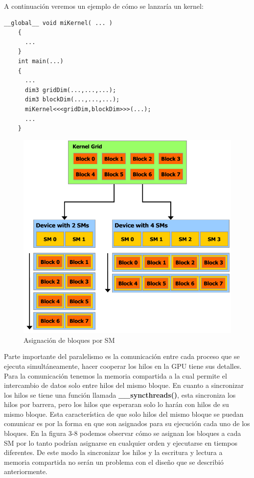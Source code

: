 A continuación veremos un ejemplo de cómo se lanzaría un kernel:

\begin{lstlisting}[caption=Lanzamiento de un Kernel en CUDA C.]
	__global__ void miKernel( ... )
    {
   	  ...
    }
	int main(...)
	{
	  ...	
	  dim3 gridDim(...,...,...);
	  dim3 blockDim(...,...,...);
	  miKernel<<<gridDim,blockDim>>>(...);	
	  ...
	}
\end{lstlisting}

\begin{figure}[h]
			\centering
				\includegraphics[scale=0.4]{img/block_sm.png}
			\caption{Asignación de bloques por SM \cite{Flops}}
\end{figure}

\pagebreak
Parte importante del paralelismo es la comunicación entre cada proceso que se ejecuta simultáneamente, hacer cooperar los hilos en la GPU tiene sus detalles. Para la comunicación tenemos la memoria compartida a la cual permite el intercambio de datos solo entre hilos del mismo bloque. En cuanto a sincronizar los hilos se tiene una función llamada \textbf{\_\_syncthreads()}, esta sincroniza los hilos por barrera, pero los hilos que esperaran solo lo harán con hilos de su mismo bloque. Esta característica de que solo hilos del mismo bloque se puedan comunicar es por la forma en que son asignados para su ejecución cada uno de los bloques. En la figura 3-8 podemos observar cómo se asignan los bloques a cada SM por lo tanto podrían asignarse en cualquier orden y ejecutarse en tiempos diferentes. De este modo la sincronizar los hilos y la escritura y lectura a memoria compartida no serán un problema con el diseño que se describió anteriormente.





